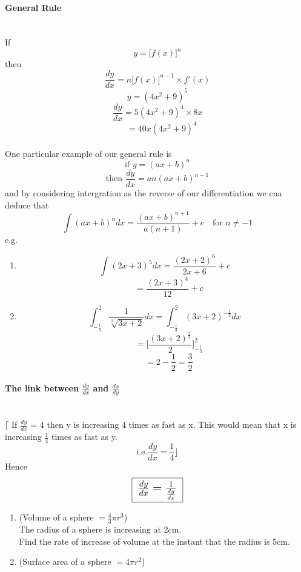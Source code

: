 \documentclass[a4paper]{article}
\newcommand\inv[1]{#1\raisebox{1.15ex}{$\scriptscriptstyle-\!1$}}
\begin{document}
\paragraph{General Rule}\mbox{}\\
If \[y=\big[ f(x) \big]^n\]
then \[\frac{dy}{dx} = n \big[ f(x) \big]^{n-1} \times f'(x)\]
\[y=(4x^2+9)^5\]
\[\frac{dy}{dx} = 5(4x^2+9)^4 \times 8x\]
\[\quad = 40x(4x^2+9)^4\]
\\
One particular example of our general rule is
\[\text{if }y=(ax+b)^n \]
\[\text{then }\frac{dy}{dx} = an(ax+b)^{n-1} \]
and by considering intergration as the reverse of our differentiation we cna deduce that
\large
\[\int(ax+b)^n dx = \frac{(ax+b)^{n+1}}{a(n+1)}+c \quad \text{for } n\neq-1 \]
e.g.
\begin{enumerate}
  \item
  \[\int(2x+3)^5dx=\frac{(2x+2)^6}{2x+6}+c\]
  \[\quad = \frac{(2x+3)^4}{12}+c \]
  \item
  \[\int^{2}_{-\frac{1}{3}} \frac{1}{\sqrt[3]{3x+2}}dx = \int^{2}_{-\frac{1}{3}} (3x+2)^{-\frac{1}{3}}dx \]
  \[\quad = \bigg[\frac{(3x+2)^{\frac{2}{3}}}{2} \bigg]^{2}_{-\frac{1}{3}} \]
  \[\quad = 2-\frac{1}{2} =\frac{3}{2} \]
  \normalsize
\end{enumerate}

\paragraph{The link between $\frac{dy}{dx}$ and $\frac{dx}{dy}$}\mbox{}\\
$\Big\lceil$ If $\frac{dy}{dx}$ = 4 then y is increasing 4 times as fast as x. This would mean that x is increasing $\frac{1}{4}$ times as fast as y.\\
\[\text{i.e.} \frac{dy}{dx} = \frac{1}{4} \Big\rfloor \]
Hence
\[\Large
\framebox[1.1\width]{
$\frac{dy}{dx} = \frac{1}{\frac{dy}{dx}}$
}
\normalsize\]

\begin{enumerate}
  \item (Volume of a sphere $=\frac{4}{3}\pi r^3$)\\
  The radius of a sphere is increasing at 2cm\inv{}.\\
  Find the rate of increase of volume at the instant that the radius is 5cm.
  \item (Surface area of a sphere $=4\pi r^2$)
\end{enumerate}
\end{document}
